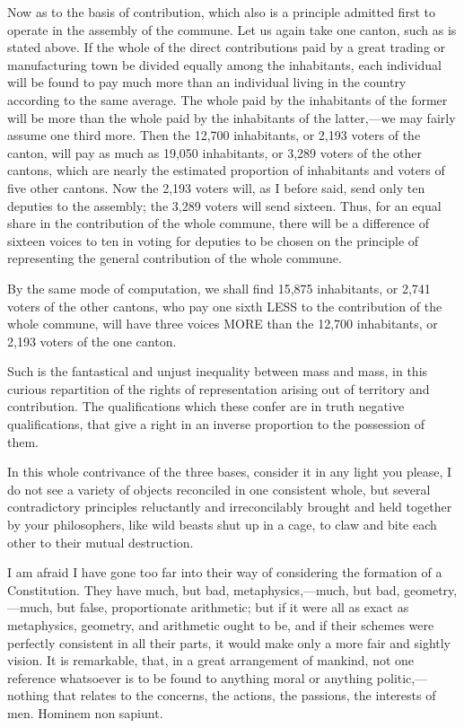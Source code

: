 Now as to the basis of contribution, which also is a principle admitted first to operate in the assembly of the commune. Let us again take one canton, such as is stated above. If the whole of the direct contributions paid by a great trading or manufacturing town be divided equally among the inhabitants, each individual will be found to pay much more than an individual living in the country according to the same average. The whole paid by the inhabitants of the former will be more than the whole paid by the inhabitants of the latter,—we may fairly assume one third more. Then the 12,700 inhabitants, or 2,193 voters of the canton, will pay as much as 19,050 inhabitants, or 3,289 voters of the other cantons, which are nearly the estimated proportion of inhabitants and voters of five other cantons. Now the 2,193 voters will, as I before said, send only ten deputies to the assembly; the 3,289 voters will send sixteen. Thus, for an equal share in the contribution of the whole commune, there will be a difference of sixteen voices to ten in voting for deputies to be chosen on the principle of representing the general contribution of the whole commune.

By the same mode of computation, we shall find 15,875 inhabitants, or 2,741 voters of the other cantons, who pay one sixth LESS to the contribution of the whole commune, will have three voices MORE than the 12,700 inhabitants, or 2,193 voters of the one canton.

Such is the fantastical and unjust inequality between mass and mass, in this curious repartition of the rights of representation arising out of territory and contribution. The qualifications which these confer are in truth negative qualifications, that give a right in an inverse proportion to the possession of them.

In this whole contrivance of the three bases, consider it in any light you please, I do not see a variety of objects reconciled in one consistent whole, but several contradictory principles reluctantly and irreconcilably brought and held together by your philosophers, like wild beasts shut up in a cage, to claw and bite each other to their mutual destruction.

I am afraid I have gone too far into their way of considering the formation of a Constitution. They have much, but bad, metaphysics,—much, but bad, geometry,—much, but false, proportionate arithmetic; but if it were all as exact as metaphysics, geometry, and arithmetic ought to be, and if their schemes were perfectly consistent in all their parts, it would make only a more fair and sightly vision. It is remarkable, that, in a great arrangement of mankind, not one reference whatsoever is to be found to anything moral or anything politic,—nothing that relates to the concerns, the actions, the passions, the interests of men. Hominem non sapiunt.

